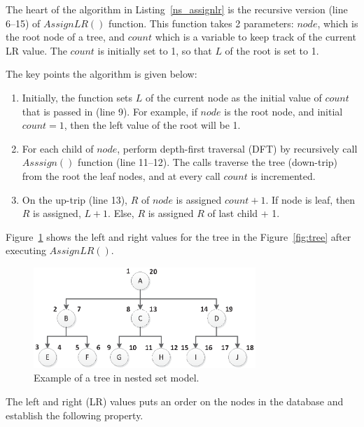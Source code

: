 The heart of the algorithm in Listing~\ref{ns_assignlr} is the recursive version (line 6--15) of $AssignLR()$ function. This function takes 2 parameters: $node$, which is the root node of a tree, and $count$ which is a variable to keep track of the current LR value. The $count$ is initially set to 1, so that $L$ of the root is set to 1.

The key points the algorithm is given below:

\begin{enumerate}
\item Initially, the function sets $L$ of the current node as the initial value of $count$ that is passed in (line 9). For example, if $node$ is the root node, and initial $count = 1$, then the left value of the root will be 1.
\item For each child of $node$, perform depth-first traversal (DFT) by recursively call $Asssign()$ function (line 11--12). The calls traverse the tree (down-trip) from the root the leaf nodes, and at every call $count$ is incremented.
\item On the up-trip (line 13), $R$ of $node$ is assigned $count + 1$. If node is leaf, then $R$ is assigned, $L + 1$. Else, $R$ is assigned $R$ of last child + 1.
\end{enumerate}

Figure~\ref{fig:tree-lr} shows the left and right values for the tree in the Figure~\ref{fig:tree} after executing $AssignLR()$.

\begin{figure}[H]
\begin{center}
\includegraphics[width=3.3in]{images/tree-lr.eps}
\caption{Example of a tree in nested set model.\label{fig:tree-lr}}
\end{center}
\end{figure}

The left and right (LR) values puts an order on the nodes in the database and establish the following property.

